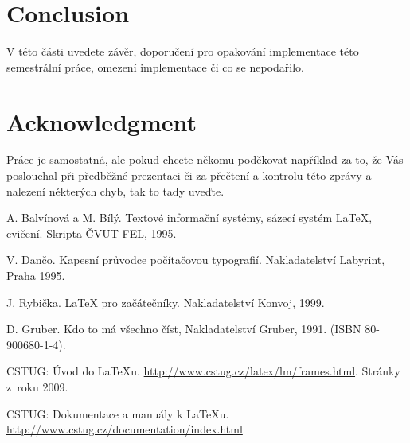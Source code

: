 \documentclass[report,11pt]{elsarticle}
\begin{document}
\section{\label{SEC:Conclusion}Conclusion}

V této části uvedete závěr, doporučení pro opakování implementace této
semestrální práce, omezení implementace či co se nepodařilo.

\section*{\label{SEC:ACK}Acknowledgment}

Práce je samostatná, ale pokud chcete někomu poděkovat například za
to, že Vás poslouchal při předběžné prezentaci či za přečtení a
kontrolu této zprávy a nalezení některých chyb, tak to tady uveďte.


%
%
%

\label{SEC:References}
\renewcommand\bibname{References}
\begin{thebibliography}{10}

A. Balvínová a M. Bílý.
\newblock Textové informační systémy, sázecí systém \LaTeX, cvičení.
Skripta ČVUT-FEL, 1995.

V. Dančo.
\newblock Kapesní průvodce počítačovou typografií. Nakladatelství
Labyrint, Praha 1995.

J. Rybička.
\newblock \LaTeX\/ pro začátečníky. Nakladatelství Konvoj, 1999.

D. Gruber.
\newblock Kdo to má všechno číst, Nakladatelství Gruber, 1991.
(ISBN 80-900680-1-4).

 CSTUG: Úvod do \LaTeX{u}.
\newblock
\url{http://www.cstug.cz/latex/lm/frames.html}. Stránky z~roku 2009.

CSTUG: Dokumentace a manuály k \LaTeX{u}.
\newblock \url{http://www.cstug.cz/documentation/index.html}

\end{thebibliography}
\end{document}

